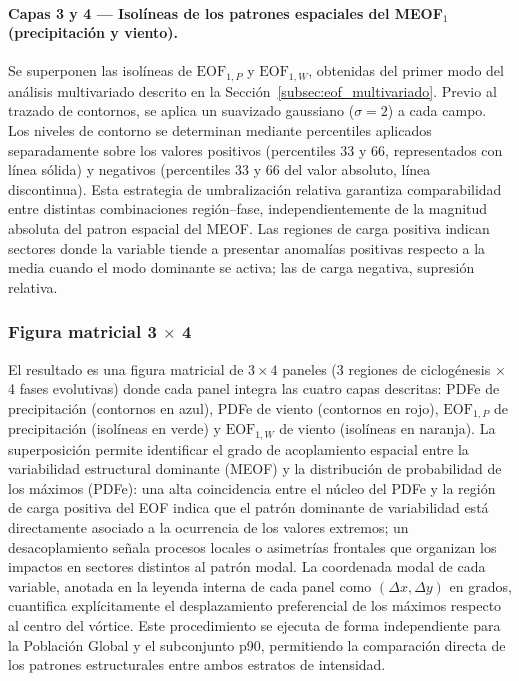 \paragraph{Capas 3 y 4 — Isolíneas de los patrones espaciales del MEOF$_1$ (precipitación y viento).}
Se superponen las isolíneas de $\text{EOF}_{1,P}$ y $\text{EOF}_{1,W}$, obtenidas del primer modo del análisis multivariado descrito en la Sección~\ref{subsec:eof_multivariado}. Previo al trazado de contornos, se aplica un suavizado gaussiano ($\sigma = 2$) a cada campo. Los niveles de contorno se determinan mediante percentiles aplicados separadamente sobre los valores positivos (percentiles 33 y 66, representados con línea sólida) y negativos (percentiles 33 y 66 del valor absoluto, línea discontinua). Esta estrategia de umbralización relativa garantiza comparabilidad entre distintas combinaciones región--fase, independientemente de la magnitud absoluta del patron espacial del MEOF. Las regiones de carga positiva indican sectores donde la variable tiende a presentar anomalías positivas respecto a la media cuando el modo dominante se activa; las de carga negativa, supresión relativa.
 
\subsubsection{Figura matricial 3 $\times$ 4}\label{subsubsec:figura_matricial}
 
El resultado es una figura matricial de $3 \times 4$ paneles (3 regiones de ciclogénesis $\times$ 4 fases evolutivas) donde cada panel integra las cuatro capas descritas: PDFe de precipitación (contornos en azul), PDFe de viento (contornos en rojo), $\text{EOF}_{1,P}$ de precipitación (isolíneas en verde) y $\text{EOF}_{1,W}$ de viento (isolíneas en naranja). La superposición permite identificar el grado de acoplamiento espacial entre la variabilidad estructural dominante (MEOF) y la distribución de probabilidad de los máximos (PDFe): una alta coincidencia entre el núcleo del PDFe y la región de carga positiva del EOF indica que el patrón dominante de variabilidad está directamente asociado a la ocurrencia de los valores extremos; un desacoplamiento señala procesos locales o asimetrías frontales que organizan los impactos en sectores distintos al patrón modal. La coordenada modal de cada variable, anotada en la leyenda interna de cada panel como $(\Delta x, \Delta y)$ en grados, cuantifica explícitamente el desplazamiento preferencial de los máximos respecto al centro del vórtice. Este procedimiento se ejecuta de forma independiente para la Población Global y el subconjunto p90, permitiendo la comparación directa de los patrones estructurales entre ambos estratos de intensidad.